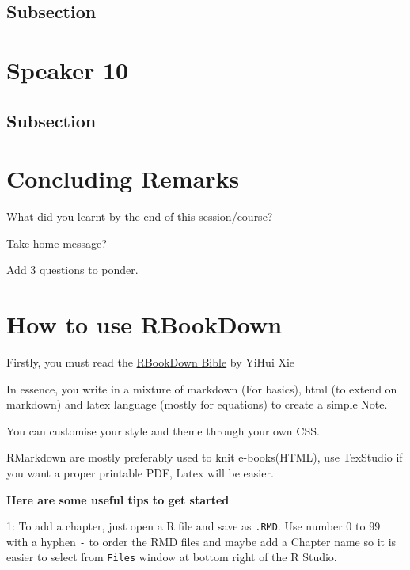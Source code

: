 \documentclass[
]{book}
\begin{document}
\hypertarget{subsection-22}{%
\section{Subsection}\label{subsection-22}}

\hypertarget{speaker-10-1}{%
\chapter*{Speaker 10}\label{speaker-10-1}}

\hypertarget{subsection-23}{%
\section{Subsection}\label{subsection-23}}

\hypertarget{concluding-remarks}{%
\chapter*{Concluding Remarks}\label{concluding-remarks}}

What did you learnt by the end of this session/course?

Take home message?

Add 3 questions to ponder.

\hypertarget{how-to-use-rbookdown}{%
\chapter*{How to use RBookDown}\label{how-to-use-rbookdown}}

Firstly, you must read the \href{https://bookdown.org/yihui/bookdown/}{RBookDown Bible} by YiHui Xie

In essence, you write in a mixture of markdown (For basics), html (to extend on markdown) and latex language (mostly for equations) to create a simple Note.

You can customise your style and theme through your own CSS.

RMarkdown are mostly preferably used to knit e-books(HTML), use TexStudio if you want a proper printable PDF, Latex will be easier.

\textbf{Here are some useful tips to get started}

1: To add a chapter, just open a R file and save as \texttt{.RMD}. Use number 0 to 99 with a hyphen \texttt{-} to order the RMD files and maybe add a Chapter name so it is easier to select from \texttt{Files} window at bottom right of the R Studio.
\end{document}
